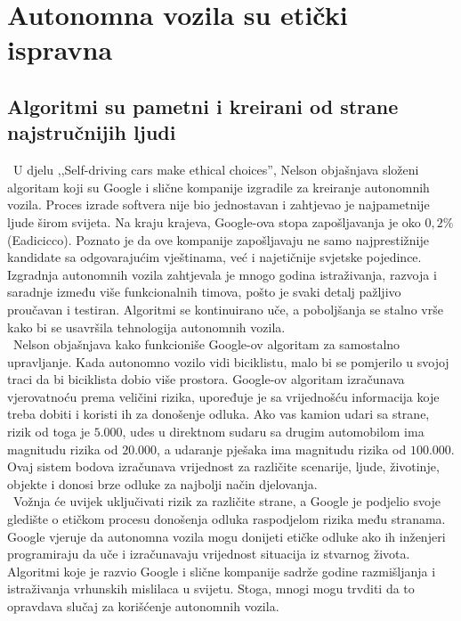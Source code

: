 \documentclass[a4paper]{article}
\begin{document}
{\section{Autonomna vozila su etički ispravna}
\label{sec:autonomna vozila su etički ispravna}
\subsection{Algoritmi su pametni i kreirani od strane \\najstručnijih ljudi}
\label{subsec:algoritmi su pametni i kreirani od strane najstručnijih ljudi}
\indent~U djelu ,,Self-driving cars make ethical choices'', Nelson objašnjava složeni algoritam koji su Google i slične kompanije izgradile za kreiranje autonomnih vozila.\cite{6} Proces izrade softvera nije bio jednostavan i zahtjevao je najpametnije ljude širom svijeta. Na kraju krajeva, Google-ova stopa zapošljavanja je oko $0,2\%$  (Eadicicco).\cite{4} Poznato je da ove kompanije zapošljavaju ne samo najprestižnije kandidate sa odgovarajućim vještinama, već  i najetičnije svjetske pojedince.\\Izgradnja autonomnih vozila zahtjevala je mnogo godina istraživanja, razvoja i saradnje između više funkcionalnih timova, pošto je svaki detalj pažljivo proučavan i testiran. Algoritmi se kontinuirano uče, a poboljšanja se stalno vrše kako bi se usavršila tehnologija autonomnih vozila.
\vspace{0.2cm}\\
\indent~Nelson objašnjava kako funkcioniše Google-ov algoritam za samostalno upravljanje. Kada autonomno vozilo vidi biciklistu, malo bi se pomjerilo u svojoj traci da bi biciklista dobio više  prostora. Google-ov algoritam izračunava vjerovatnoću prema veličini rizika, upoređuje je sa vrijednošću informacija koje treba dobiti i koristi ih za donošenje odluka. Ako vas kamion udari sa strane, rizik od toga je $5.000$, udes u direktnom sudaru sa drugim automobilom ima magnitudu rizika od $20.000$, a udaranje pješaka ima magnitudu rizika od $100.000$. Ovaj sistem bodova izračunava vrijednost za različite scenarije, ljude, životinje, objekte i donosi brze odluke za najbolji način djelovanja.
\vspace{0.2cm}\\
\indent~Vožnja će uvijek uključivati rizik za različite strane, a Google je podjelio svoje gledište o etičkom procesu donošenja odluka raspodjelom rizika među stranama. Google vjeruje da autonomna vozila mogu donijeti etičke odluke ako ih inženjeri programiraju da uče i izračunavaju vrijednost situacija iz stvarnog života. Algoritmi koje je razvio Google i slične kompanije sadrže godine razmišljanja i istraživanja vrhunskih mislilaca u svijetu. Stoga, mnogi mogu trvditi da to opravdava slučaj za korišćenje autonomnih vozila.

}
\end{document}
